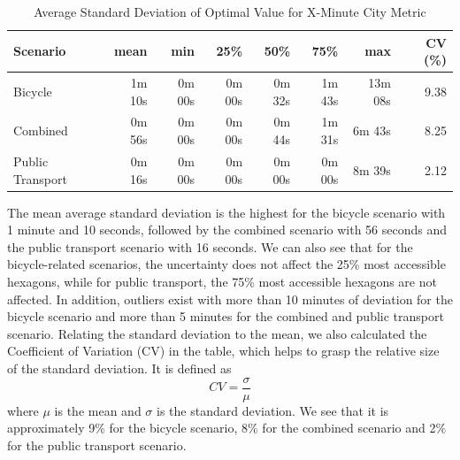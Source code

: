 \begin{table}
  \caption{Average Standard Deviation of Optimal Value for X-Minute City Metric}
  \label{tab:average_standard_deviation_of_optimal_value_for_x_minute_city_metric}
  \begin{center}
    \begin{tabular}{|l|r|r|r|r|r|r|r|}
    \hline
    Scenario & mean & min & 25\% & 50\% & 75\% & max & CV (\%) \\
    \hline
    Bicycle & 1m 10s & 0m 00s & 0m 00s & 0m 32s & 1m 43s & 13m 08s & 9.38 \\
    \hline
    Combined & 0m 56s & 0m 00s & 0m 00s & 0m 44s & 1m 31s & 6m 43s & 8.25 \\
    \hline
    Public Transport & 0m 16s & 0m 00s & 0m 00s & 0m 00s & 0m 00s & 8m 39s & 2.12 \\
    \hline
    \end{tabular}
  \end{center}
\end{table}


The mean average standard deviation is the highest for the bicycle scenario with 1 minute and 10 seconds, followed by the combined scenario with 56 seconds and the public transport scenario with 16 seconds.
We can also see that for the bicycle-related scenarios, the uncertainty does not affect the 25\% most accessible hexagons, while for public transport, the 75\% most accessible hexagons are not affected.
In addition, outliers exist with more than 10 minutes of deviation for the bicycle scenario and more than 5 minutes for the combined and public transport scenario.
Relating the standard deviation to the mean, we also calculated the Coefficient of Variation (CV) in the table, which helps to grasp the relative size of the standard deviation.
It is defined as
$$ CV = \frac{\sigma}{\mu} $$
where $\mu$ is the mean and $\sigma$ is the standard deviation.
We see that it is approximately 9\% for the bicycle scenario, 8\% for the combined scenario and 2\% for the public transport scenario.

